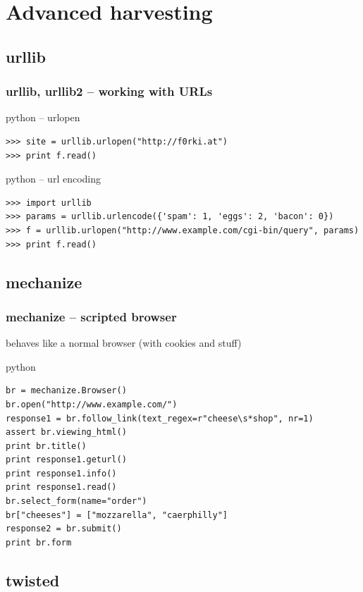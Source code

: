 \documentclass{beamer}
\begin{document}
\section{Advanced harvesting}


\subsection*{urllib}	%
\begin{frame}[fragile]
	\frametitle{urllib, urllib2 -- working with URLs}
	\begin{exampleblock}{python -- urlopen}
	\begin{lstlisting}
>>> site = urllib.urlopen("http://f0rki.at")
>>> print f.read()
	\end{lstlisting}
	\end{exampleblock}
\pause	
	\begin{exampleblock}{python -- url encoding}
	\begin{lstlisting}
>>> import urllib
>>> params = urllib.urlencode({'spam': 1, 'eggs': 2, 'bacon': 0})
>>> f = urllib.urlopen("http://www.example.com/cgi-bin/query", params)
>>> print f.read()
	\end{lstlisting}
	\end{exampleblock}
\end{frame}

\subsection*{mechanize} %
\begin{frame}[fragile]
	\frametitle{mechanize -- scripted browser}
	behaves like a normal browser (with cookies and stuff)
	\begin{exampleblock}{python}
	\begin{lstlisting}
br = mechanize.Browser()
br.open("http://www.example.com/")
response1 = br.follow_link(text_regex=r"cheese\s*shop", nr=1)
assert br.viewing_html()
print br.title()
print response1.geturl()
print response1.info()
print response1.read()
br.select_form(name="order")
br["cheeses"] = ["mozzarella", "caerphilly"]
response2 = br.submit()
print br.form
	\end{lstlisting}
	\end{exampleblock}
\end{frame}

\subsection*{twisted}	%
\end{document}
